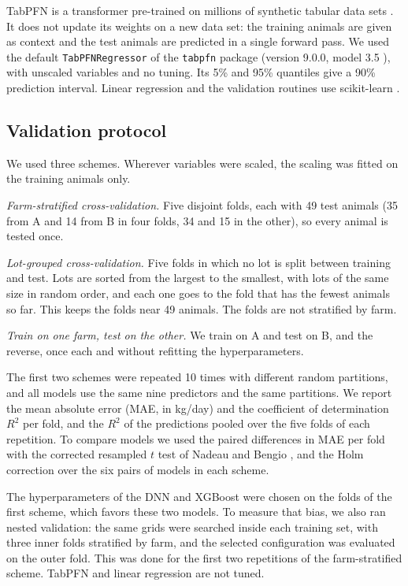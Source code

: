 \documentclass[runningheads]{llncs}
\begin{document}
TabPFN is a transformer pre-trained on millions of synthetic tabular data sets \cite{hollmann2025tabpfn}. It does not update its weights on a new data set: the training animals are given as context and the test animals are predicted in a single forward pass. We used the default \texttt{TabPFNRegressor} of the \texttt{tabpfn} package (version 9.0.0, model 3.5 \cite{jager2026tabpfn35}), with unscaled variables and no tuning. Its 5\% and 95\% quantiles give a 90\% prediction interval. Linear regression and the validation routines use scikit-learn \cite{pedregosa2011sklearn}.

\subsection{Validation protocol}\label{sec:val}

We used three schemes. Wherever variables were scaled, the scaling was fitted on the training animals only.

\textit{Farm-stratified cross-validation.} Five disjoint folds, each with 49 test animals (35 from A and 14 from B in four folds, 34 and 15 in the other), so every animal is tested once.

\textit{Lot-grouped cross-validation.} Five folds in which no lot is split between training and test. Lots are sorted from the largest to the smallest, with lots of the same size in random order, and each one goes to the fold that has the fewest animals so far. This keeps the folds near 49 animals. The folds are not stratified by farm.

\textit{Train on one farm, test on the other.} We train on A and test on B, and the reverse, once each and without refitting the hyperparameters.

The first two schemes were repeated 10 times with different random partitions, and all models use the same nine predictors and the same partitions. We report the mean absolute error (MAE, in kg/day) and the coefficient of determination $R^2$ per fold, and the $R^2$ of the predictions pooled over the five folds of each repetition. To compare models we used the paired differences in MAE per fold with the corrected resampled $t$ test of Nadeau and Bengio \cite{nadeau2003}, and the Holm correction \cite{holm1979} over the six pairs of models in each scheme.

The hyperparameters of the DNN and XGBoost were chosen on the folds of the first scheme, which favors these two models. To measure that bias, we also ran nested validation: the same grids were searched inside each training set, with three inner folds stratified by farm, and the selected configuration was evaluated on the outer fold. This was done for the first two repetitions of the farm-stratified scheme. TabPFN and linear regression are not tuned.
\end{document}
